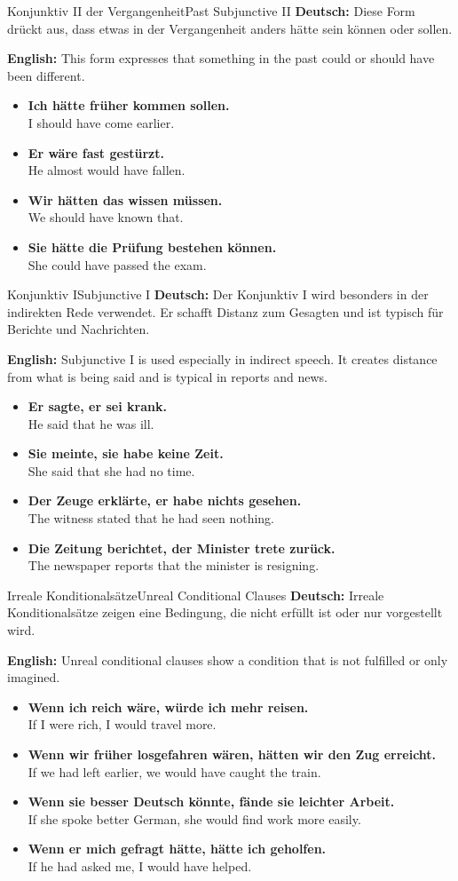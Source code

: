 \documentclass[a4paper,11pt]{article}
\newcommand{\GermanText}[1]{\textbf{Deutsch: }#1\par}
\newcommand{\EnglishText}[1]{{\color{SoftGray}\textbf{English: }#1\par}}
\newcommand{\ExampleItem}[2]{\item \textbf{#1}\\{\color{SoftGray}#2}}
\begin{document}
\begin{grammarentry}{Konjunktiv II der Vergangenheit}{Past Subjunctive II}
    \GermanText{Diese Form drückt aus, dass etwas in der Vergangenheit anders hätte sein können oder sollen.}
    \EnglishText{This form expresses that something in the past could or should have been different.}
    \begin{exbox}
        \begin{itemize}
            \ExampleItem{Ich hätte früher kommen sollen.}{I should have come earlier.}
            \ExampleItem{Er wäre fast gestürzt.}{He almost would have fallen.}
            \ExampleItem{Wir hätten das wissen müssen.}{We should have known that.}
            \ExampleItem{Sie hätte die Prüfung bestehen können.}{She could have passed the exam.}
        \end{itemize}
    \end{exbox}
\end{grammarentry}

\begin{grammarentry}{Konjunktiv I}{Subjunctive I}
    \GermanText{Der Konjunktiv I wird besonders in der indirekten Rede verwendet. Er schafft Distanz zum Gesagten und ist typisch für Berichte und Nachrichten.}
    \EnglishText{Subjunctive I is used especially in indirect speech. It creates distance from what is being said and is typical in reports and news.}
    \begin{exbox}
        \begin{itemize}
            \ExampleItem{Er sagte, er sei krank.}{He said that he was ill.}
            \ExampleItem{Sie meinte, sie habe keine Zeit.}{She said that she had no time.}
            \ExampleItem{Der Zeuge erklärte, er habe nichts gesehen.}{The witness stated that he had seen nothing.}
            \ExampleItem{Die Zeitung berichtet, der Minister trete zurück.}{The newspaper reports that the minister is resigning.}
        \end{itemize}
    \end{exbox}
\end{grammarentry}

\begin{grammarentry}{Irreale Konditionalsätze}{Unreal Conditional Clauses}
    \GermanText{Irreale Konditionalsätze zeigen eine Bedingung, die nicht erfüllt ist oder nur vorgestellt wird.}
    \EnglishText{Unreal conditional clauses show a condition that is not fulfilled or only imagined.}
    \begin{exbox}
        \begin{itemize}
            \ExampleItem{Wenn ich reich wäre, würde ich mehr reisen.}{If I were rich, I would travel more.}
            \ExampleItem{Wenn wir früher losgefahren wären, hätten wir den Zug erreicht.}{If we had left earlier, we would have caught the train.}
            \ExampleItem{Wenn sie besser Deutsch könnte, fände sie leichter Arbeit.}{If she spoke better German, she would find work more easily.}
            \ExampleItem{Wenn er mich gefragt hätte, hätte ich geholfen.}{If he had asked me, I would have helped.}
        \end{itemize}
    \end{exbox}
\end{grammarentry}
\end{document}
